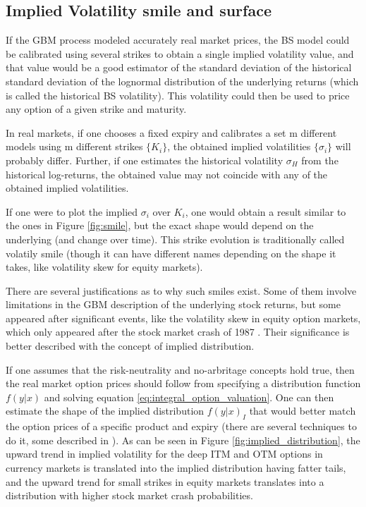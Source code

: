 \documentclass[12,twoside]{mammeTFM}
\theoremstyle{definition}
\theoremstyle{remark}
\begin{document}
\subsection{Implied Volatility smile and surface} \label{subsec:smile_and_surf}
If the GBM process modeled accurately real market prices, the BS model could be calibrated using several strikes to obtain a single implied volatility value, and that value would be a good estimator of the standard deviation of the historical standard deviation of the lognormal distribution of the underlying returns (which is called the historical BS volatility). This volatility could then be used to price any option of a given strike and maturity. 

In real markets, if one chooses a fixed expiry and calibrates a set  m different models using m different strikes $\{K_i\}$, the obtained implied volatilities $\{\sigma_i\}$ will probably differ. Further, if one estimates the historical volatility $\sigma_H$ from the historical log-returns, the obtained value may not coincide with any of the obtained implied volatilities.

If one were to plot the implied $\sigma_i$ over $K_i$, one would obtain a result similar to the ones in Figure \ref{fig:smile}, but the exact shape would depend on the underlying (and change over time). This strike evolution is traditionally called volatily smile (though it can have different names depending on the shape it takes, like volatility skew for equity markets).

There are several justifications as to why such smiles exist. Some of them involve limitations in the GBM description of the underlying stock returns, but some appeared after significant events, like the volatility skew in equity option markets, which only appeared after the stock market crash of 1987 \cite{hul09}. Their significance is better described with the concept of implied distribution.

If one assumes that the risk-neutrality and no-arbritage concepts hold true, then the real market option prices should follow from specifying a distribution function $f(y|x)$ and solving equation \ref{eq:integral_option_valuation}. One can then estimate the shape of the implied distribution $f(y|x)_I$ that would better match the option prices of a specific product and expiry (there are several techniques to do it, some described in \cite{jac96, pea00}). As can be seen in Figure \ref{fig:implied_distribution}, the upward trend in implied volatility for the deep ITM and OTM options in currency markets is translated into the implied distribution having fatter tails, and the upward trend for small strikes in equity markets translates into a distribution with higher stock market crash probabilities.
\end{document}
